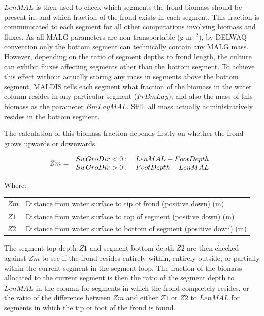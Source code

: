 \documentclass{deltares_manual}
\begin{document}
$LenMAL$ is then used to check which segments the frond biomass should be present in, and which fraction of the frond exists in each segment. This fraction is communicated to each segment for all other computations involving biomass and fluxes. As all MALG parameters are non-transportable (g m$^{-2}$), by DELWAQ convention only the bottom segment can technically contain any MALG mass. However, depending on the ratio of segment depths to frond length, the culture can exhibit fluxes affecting segments other than the bottom segment. To achieve this effect without actually storing any mass in segments above the bottom segment, MALDIS tells each segment what fraction of the biomass in the water column resides in any particular segment ($FrBmLay$), and also the mass of this biomass as the parameter $BmLayMAL$. Still, all mass actually administratively resides in the bottom segment.

The calculation of this biomass fraction depends firstly on whether the frond grows upwards or downwards.

\begin{equation}
Zm =  
\left 
.\begin{tabular}{cc}
$SwGroDir < 0:$& $LenMAL + FootDepth$\\
$SwGroDir > 0:$& $FootDepth - LenMAL$\\
\end{tabular}
\right
.\end{equation}

Where:\\

\begin{tabular}{ll}
$Zm$ & Distance from water surface to tip of frond (positive down) (m)\\
$Z1$ & Distance from water surface to top of segment (positive down) (m)\\
$Z2$ & Distance from water surface to bottom of segment (positive down) (m)\\
\end{tabular}

The segment top depth $Z1$ and segment bottom depth $Z2$ are then checked against $Zm$ to see if the frond resides entirely within, entirely outside, or partially within the current segment in the segment loop. The fraction of the biomass allocated to the current segment is then the ratio of the segment depth to $LenMAL$ in the column for segments in which the frond completely resides, or the ratio of the difference between $Zm$ and either $Z1$ or $Z2$ to $LenMAL$ for segments in which the tip or foot of the frond is found.
\end{document}
